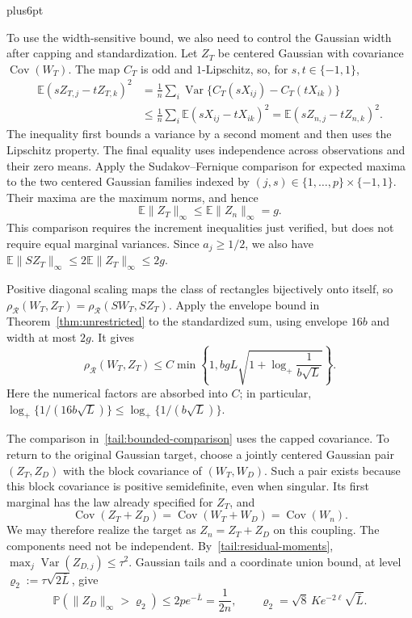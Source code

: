 \documentclass[11pt,letterpaper,twoside,leqno]{article}
\makeatletter
\theoremstyle{bookplain}
\theoremstyle{bookremark}
\renewenvironment{proof}[1][\proofname]{\par
  \pushQED{\qed}\normalfont\topsep6pt plus6pt\relax
  \trivlist\item[\hskip\labelsep\bfseries #1\@addpunct{.}]\ignorespaces
}{\popQED\endtrivlist\@endpefalse}
\newcommand{\E}{\mathbb E}
\newcommand{\Pp}{\mathbb P}
\newcommand{\Cov}{\operatorname{Cov}}
\newcommand{\Var}{\operatorname{Var}}
\newcommand{\rh}{\rho_{\mathcal R}}
\makeatother
\begin{document}
\begin{proof}[Proof of Corollary~\ref{cor:subexponential}]
To use the width-sensitive bound, we also need to control the Gaussian
width after capping and standardization. Let $Z_T$ be centered Gaussian
with covariance $\Cov(W_T)$. The map $C_T$ is odd and $1$-Lipschitz,
so, for $s,t\in\{-1,1\}$,
\begin{align*}
 \E(sZ_{T,j}-tZ_{T,k})^2
 &=\frac1n\sum_i\Var\{C_T(sX_{ij})-C_T(tX_{ik})\}\\
 &\le\frac1n\sum_i\E(sX_{ij}-tX_{ik})^2
 =\E(sZ_{n,j}-tZ_{n,k})^2.
\end{align*}
The inequality first bounds a variance by a second moment and then
uses the Lipschitz property. The final equality uses independence
across observations and their zero means.
Apply the Sudakov--Fernique comparison for expected maxima
\cite[Theorem~2.6.5]{AdlerTaylorWorsley2015} to the two centered
Gaussian families indexed by $(j,s)\in\{1,\ldots,p\}\times\{-1,1\}$.
Their maxima are the maximum norms, and hence
\begin{equation}
 \E\|Z_T\|_\infty\le\E\|Z_n\|_\infty=g.
 \label{tail:width-contraction}
\end{equation}
This comparison requires the increment inequalities just verified,
but does not require equal marginal variances.
Since $a_j\ge1/2$, we also have
$\E\|SZ_T\|_\infty\le2\E\|Z_T\|_\infty\le2g$.

Positive diagonal scaling maps the class of rectangles bijectively
onto itself, so $\rh(W_T,Z_T)=\rh(SW_T,SZ_T)$.
Apply the envelope bound in Theorem~\ref{thm:unrestricted} to the
standardized sum, using envelope $16b$ and width at most $2g$.
It gives
\begin{equation}
 \rh(W_T,Z_T)\le C\min\left\{1,
 bgL\sqrt{1+\log_+\frac1{b\sqrt L}}\right\}.
 \label{tail:bounded-comparison}
\end{equation}
Here the numerical factors are absorbed into $C$; in particular,
$\log_+\{1/(16b\sqrt L)\}\le\log_+\{1/(b\sqrt L)\}$.

The comparison in~\eqref{tail:bounded-comparison} uses the capped
covariance. To return to the original Gaussian target, choose a jointly
centered Gaussian pair $(Z_T,Z_D)$ with the block covariance of
$(W_T,W_D)$. Such a pair exists because this block covariance is
positive semidefinite, even when singular. Its first marginal has the
law already specified for $Z_T$, and
\[
 \Cov(Z_T+Z_D)=\Cov(W_T+W_D)=\Cov(W_n).
\]
We may therefore realize the target as $Z_n=Z_T+Z_D$ on this coupling.
The components need not be independent. By~\eqref{tail:residual-moments},
$\max_j\Var(Z_{D,j})\le\tau^2$.
Gaussian tails and a coordinate union bound, at level
$\varrho_2:=\tau\sqrt{2\bar L}$, give
\begin{equation}
 \Pp(\|Z_D\|_\infty>\varrho_2)
 \le2p e^{-\bar L}=\frac1{2n},\qquad
 \varrho_2=\sqrt8\,Ke^{-2\ell}\sqrt{\bar L}.
 \label{tail:Gaussian-coupling}
\end{equation}


\end{proof}
\end{document}
